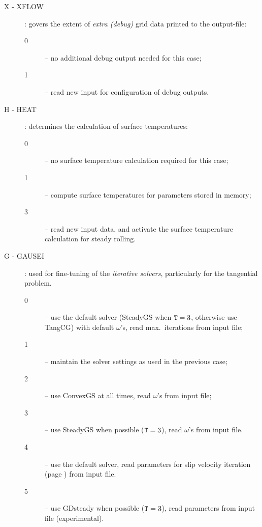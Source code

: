 \documentclass[12pt]{report}
\begin{document}
\begin{description}
\item[X - XFLOW] \label{x-digit} : govers the extent of {\em extra
        (debug)\/} grid data printed to the output-file:
\begin{description}
\item[0] -- no additional debug output needed for this case;
\item[1] -- read new input for configuration of debug outputs.
\end{description}

\item[H - HEAT]\label{h-digit} : determines the calculation of surface
        temperatures:
\begin{description}
\item[0] -- no surface temperature calculation required for this case;
\item[1] -- compute surface temperatures for parameters stored in memory;
\item[3] -- read new input data, and activate the surface temperature
        calculation for steady rolling.
\end{description}

\item[G - GAUSEI] \label{g-digit} : used for fine-tuning of the {\em iterative
        solvers\/}, particularly for the tangential problem.
\begin{description}
\item[0] -- use the default solver (SteadyGS when ${\tt T}=3$,
        otherwise use TangCG) with default $\omega$'s, read max.\
        iterations from input file;
\item[1] -- maintain the solver settings as used in the previous case;
\item[2] -- use ConvexGS at all times, read $\omega$'s from input file;
\item[3] -- use SteadyGS when possible (${\tt T}=3$), read $\omega$'s from
        input file.
\item[4] -- use the default solver, read parameters for slip velocity
        iteration (page \pageref{itm:slip_veloc}) from input file.
\item[5] -- use GDsteady when possible (${\tt T}=3$), read parameters
        from input file (experimental).
\end{description}


\end{description}
\end{document}
